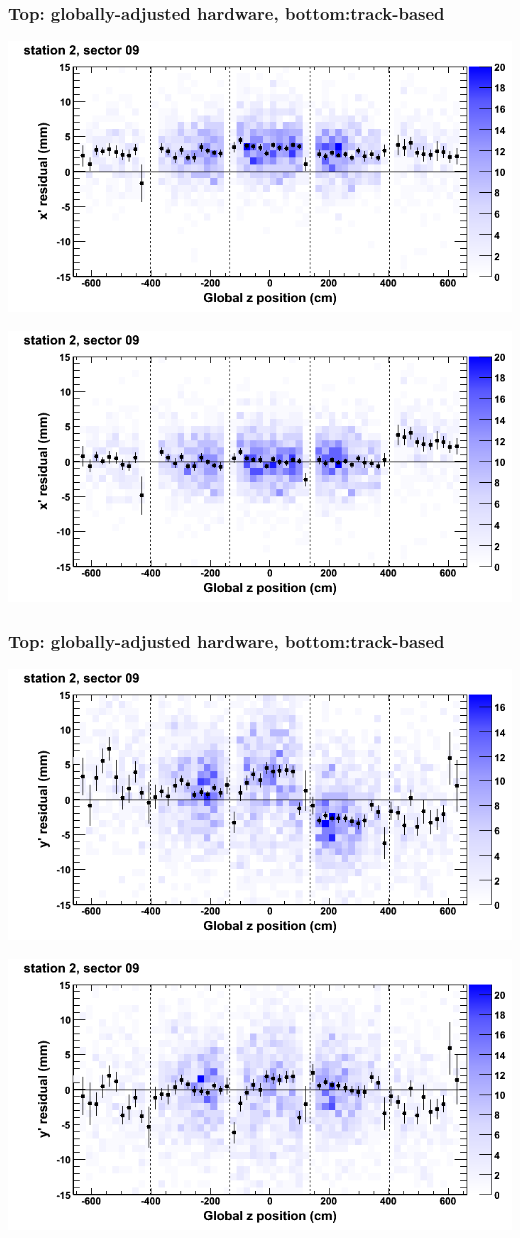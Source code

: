 \documentclass[compress]{beamer}
\begin{document}
\begin{frame}
\frametitle{Top: globally-adjusted hardware, bottom:track-based}
\includegraphics[width=0.7\linewidth]{NOV4_mapplots_HW/DTvsz_st2sec09_x.png}

\includegraphics[width=0.7\linewidth]{NOV4_mapplots/DTvsz_st2sec09_x.png}
\end{frame}

\begin{frame}
\frametitle{Top: globally-adjusted hardware, bottom:track-based}
\includegraphics[width=0.7\linewidth]{NOV4_mapplots_HW/DTvsz_st2sec09_y.png}

\includegraphics[width=0.7\linewidth]{NOV4_mapplots/DTvsz_st2sec09_y.png}
\end{frame}
\end{document}
